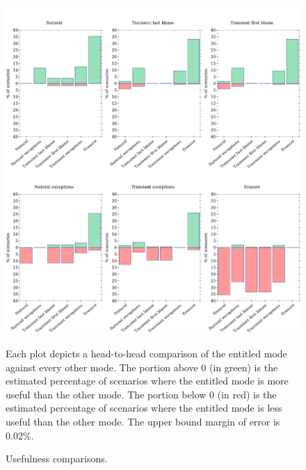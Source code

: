 \begin{figure}
  \centering
  \includegraphics[width=\textwidth]{./plots/avo-bars}

  \vspace{1em}
  \begin{minipage}{0.95\textwidth}
  Each plot depicts a head-to-head comparison of the entitled mode against every other mode.
  The portion above 0 (in green) is the estimated percentage of scenarios where the entitled mode is more useful
    than the other mode.
  The portion below 0 (in red) is the estimated percentage of scenarios
    where the entitled mode is less useful than the other mode.
  The upper bound margin of error is 0.02\%.
  \end{minipage}

  \caption{Usefulness comparisons.}
  \label{fig:avo-bars}
\end{figure}

